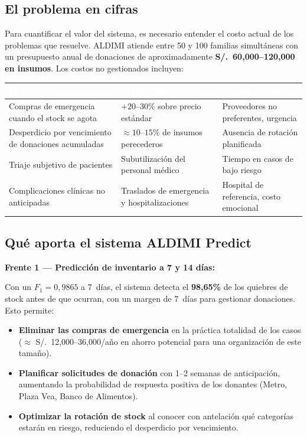 \documentclass[12pt, a4paper]{article}
\begin{document}
\subsection{El problema en cifras}

Para cuantificar el valor del sistema, es necesario entender el costo actual de los problemas que resuelve. ALDIMI atiende entre 50 y 100 familias simult\'aneas con un presupuesto anual de donaciones de aproximadamente \textbf{S/.~60{,}000--120{,}000 en insumos}. Los costos no gestionados incluyen:

\begin{center}
\begin{tabular}{L{5.5cm} L{3.5cm} L{4.5cm}}
  \toprule
  \textcolor{white}{\textbf{Problema}} &
  \textcolor{white}{\textbf{Impacto estimado}} &
  \textcolor{white}{\textbf{Fuente del costo}} \\
  \midrule
  Compras de emergencia cuando el stock se agota &
  $+20$--$30\%$ sobre precio est\'andar &
  Proveedores no preferentes, urgencia \\
  Desperdicio por vencimiento de donaciones acumuladas &
  $\approx 10$--$15\%$ de insumos perecederos &
  Ausencia de rotaci\'on planificada \\
  Triaje subjetivo de pacientes &
  Subutilizaci\'on del personal m\'edico &
  Tiempo en casos de bajo riesgo \\
  Complicaciones cl\'inicas no anticipadas &
  Traslados de emergencia y hospitalizaciones &
  Hospital de referencia, costo emocional \\
  \bottomrule
\end{tabular}
\end{center}

\subsection{Qu\'e aporta el sistema ALDIMI Predict}

\begin{warnbox}
\textbf{Frente 1 --- Predicci\'on de inventario a 7 y 14 d\'ias:}

Con un $F_1 = 0{,}9865$ a 7~d\'ias, el sistema detecta el \textbf{98{,}65\%} de los quiebres de stock antes de que ocurran, con un margen de 7~d\'ias para gestionar donaciones. Esto permite:
\begin{itemize}[leftmargin=1.5em, itemsep=3pt]
  \item \textbf{Eliminar las compras de emergencia} en la pr\'actica totalidad de los casos ($\approx$ S/.~12{,}000--36{,}000/a\~no en ahorro potencial para una organizaci\'on de este tama\~no).
  \item \textbf{Planificar solicitudes de donaci\'on} con 1--2 semanas de anticipaci\'on, aumentando la probabilidad de respuesta positiva de los donantes (Metro, Plaza Vea, Banco de Alimentos).
  \item \textbf{Optimizar la rotaci\'on de stock} al conocer con antelaci\'on qu\'e categor\'ias estar\'an en riesgo, reduciendo el desperdicio por vencimiento.
\end{itemize}
\end{warnbox}
\end{document}
